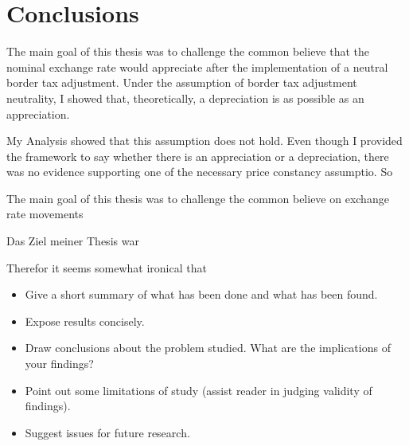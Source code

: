 \section{Conclusions}\label{Sec:Conc}

The main goal of this thesis was to challenge the common believe that the nominal exchange rate would appreciate after the implementation of a neutral border tax adjustment. Under the assumption of border tax adjustment neutrality, I showed that, theoretically, a depreciation is as possible as an appreciation. 

My Analysis showed that this assumption does not hold. Even though I provided the framework to say whether there is an appreciation or a depreciation, there was no evidence supporting one of the necessary price constancy assumptio. So 

The main goal of this thesis was to challenge the common believe on exchange rate movements 

Das Ziel meiner Thesis war 

Therefor it seems somewhat ironical that 
\begin{itemize}

    \item Give a short summary of what has been done and what has been
    found.

    \item Expose results concisely.

    \item Draw conclusions about the problem studied. What are the
    implications of your findings?

    \item Point out some limitations of study (assist reader in judging validity
    of findings).

    \item Suggest issues for future research.
    

\end{itemize}



